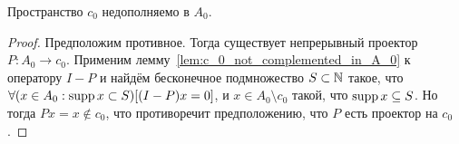 \begin{theorem}
	Пространство $c_0$ недополняемо в $A_0$.
\end{theorem}

\begin{proof}
	Предположим противное.
	Тогда существует непрерывный проектор $P: A_0 \to c_0$.
	Применим лемму~\ref{lem:c_0_not_complemented_in_A_0} к оператору $I-P$
	и найдём бесконечное подмножество $S\subset\mathbb{N}$ такое,
	что $\forall(x\in A_0 : \operatorname{supp} x \subset S)[(I-P)x = 0]$,
	и $x\in A_0 \setminus c_0$ такой, что $\operatorname{supp} x \subseteq S$.
	Но тогда  $Px = x\notin c_0$,
	что противоречит предположению, что $P$ есть проектор на $c_0$.
\end{proof}

